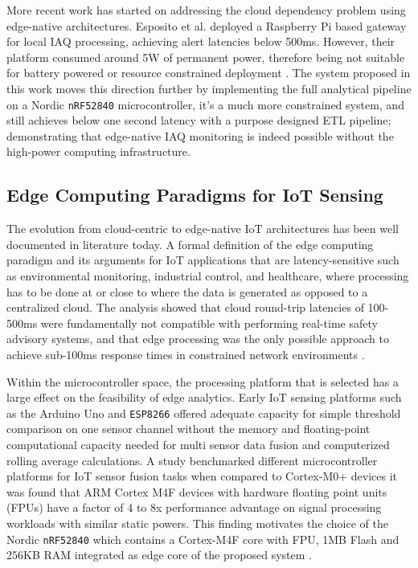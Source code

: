 \documentclass[conference]{IEEEtran}
\begin{document}
More recent work has started on addressing the cloud dependency problem using edge-native architectures. Esposito et al. deployed a Raspberry Pi based gateway for local IAQ processing, achieving alert latencies below 500ms. However, their platform consumed around 5W of permanent power, therefore being not suitable for battery powered or resource constrained deployment \cite{b6}. The system proposed in this work moves this direction further by implementing the full analytical pipeline on a Nordic \texttt{nRF52840} microcontroller, it's a much more constrained system, and still achieves below one second latency with a purpose designed ETL pipeline; demonstrating that edge-native IAQ monitoring is indeed possible without the high-power computing infrastructure.


\subsection{Edge Computing Paradigms for IoT Sensing}

The evolution from cloud-centric to edge-native IoT architectures has been well documented in literature today. A formal definition of the edge computing paradigm and its arguments for IoT applications that are latency-sensitive such as environmental monitoring, industrial control, and healthcare, where processing has to be done at or close to where the data is generated as opposed to a centralized cloud. The analysis showed that cloud round-trip latencies of 100-500ms were fundamentally not compatible with performing real-time safety advisory systems, and that edge processing was the only possible approach to achieve sub-100ms response times in constrained network environments \cite{b7}.

Within the microcontroller space, the processing platform that is selected has a large effect on the feasibility of edge analytics. Early IoT sensing platforms such as the Arduino Uno and \texttt{ESP8266} offered adequate capacity for simple threshold comparison on one sensor channel without the memory and floating-point computational capacity needed for multi sensor data fusion and computerized rolling average calculations. A study benchmarked different microcontroller platforms for IoT sensor fusion tasks when compared to Cortex-M0+ devices it was found that ARM Cortex M4F devices with hardware floating point units (FPUs) have a factor of 4 to 8x performance advantage on signal processing workloads with similar static powers. This finding motivates the choice of the Nordic \texttt{nRF52840} which contains a Cortex-M4F core with FPU, 1MB Flash and 256KB RAM integrated as edge core of the proposed system \cite{b8}.
\end{document}
